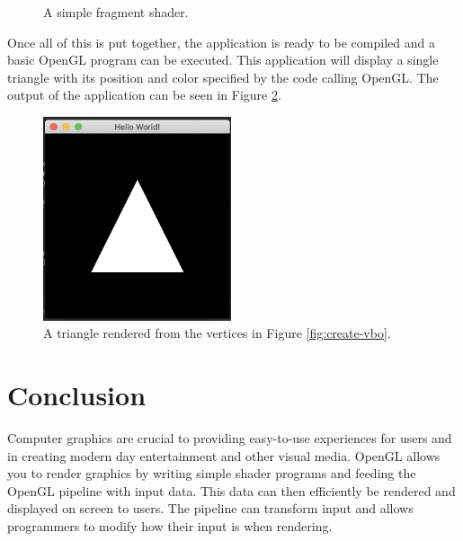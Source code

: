 \documentclass{article}
\begin{document}
\begin{figure}[h]
	
	\caption{A simple fragment shader.}
	\label{fig:fragment-shader}
\end{figure}

Once all of this is put together, the application is ready to be compiled and a basic OpenGL program can be executed. This application will display a single triangle with its position and color specified by the code calling OpenGL. The output of the application can be seen in Figure \ref{fig:final-product}.

\begin{figure}[h]
    \centering
    \includegraphics[height=6cm]{triangle}
	\caption{A triangle rendered from the vertices in Figure \ref{fig:create-vbo}.}
	\label{fig:final-product}
\end{figure}

\section{Conclusion}
Computer graphics are crucial to providing easy-to-use experiences for users and in creating modern day entertainment and other visual media. OpenGL allows you to render graphics by writing simple shader programs and feeding the OpenGL pipeline with input data. This data can then efficiently be rendered and displayed on screen to users. The pipeline can transform input and allows programmers to modify how their input is when rendering.

\clearpage

{}

\end{document}
